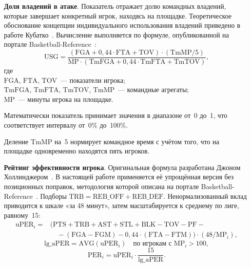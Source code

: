 \textbf{Доля владений в атаке}. Показатель отражает долю командных владений,
которые завершает конкретный игрок, находясь на площадке. Теоретическое
обоснование концепции индивидуального использования владений приведено
в работе Кубатко~\cite{kubatko}. Вычисление выполняется по формуле,
опубликованной на портале Basketball-Reference~\cite{bref}:
\begin{equation}
\mathrm{USG} =
\frac{(\mathrm{FGA} + 0{,}44 \cdot \mathrm{FTA} + \mathrm{TOV})
      \cdot (\mathrm{TmMP} / 5)}
     {\mathrm{MP} \cdot (\mathrm{TmFGA} + 0{,}44 \cdot
      \mathrm{TmFTA} + \mathrm{TmTOV})},
\end{equation}
\noindent где\\
$\mathrm{FGA}$, $\mathrm{FTA}$, $\mathrm{TOV}$~--- показатели игрока;\\
$\mathrm{TmFGA}$, $\mathrm{TmFTA}$, $\mathrm{TmTOV}$, $\mathrm{TmMP}$~---
командные агрегаты;\\
$\mathrm{MP}$~--- минуты игрока на площадке.

Математически показатель принимает значения в диапазоне от~0 до~1,
что соответствует интервалу от~0\% до~100\%.

Деление $\mathrm{TmMP}$ на~5 нормирует командное время с учётом того, что на
площадке одновременно находятся пять игроков.

\textbf{Рейтинг эффективности игрока}. Оригинальная формула разработана Джоном
Холлинджером~\cite{hollinger}. В настоящей работе применяется её упрощённая версия без
позиционных поправок, методология которой описана на портале Basketball-Reference~\cite{per-bref}.
Подборы $\mathrm{TRB} = \mathrm{REB\_OFF} + \mathrm{REB\_DEF}$.
Ненормализованный вклад приводится к шкале «за 48 минут», затем масштабируется
к среднему по лиге, равному~15:
\begin{equation}
\begin{aligned}
\mathrm{uPER}_i = {}& (\mathrm{PTS} + \mathrm{TRB} + \mathrm{AST} + \mathrm{STL}
+ \mathrm{BLK} - \mathrm{TOV} - \mathrm{PF} - \\
&\quad - (\mathrm{FGA} - \mathrm{FGM})
- 0{,}44 \cdot (\mathrm{FTA} - \mathrm{FTM})) \cdot (48 / \mathrm{MP}_i),
\end{aligned}
\end{equation}
\begin{equation}
\mathrm{lg\_aPER} = \mathrm{AVG}(\mathrm{uPER}_i)
\quad\text{по игрокам с }\mathrm{MP}_i > 100,
\end{equation}
\begin{equation}
\mathrm{PER}_i = \mathrm{uPER}_i \cdot \frac{15}{\mathrm{lg\_aPER}}.
\end{equation}

